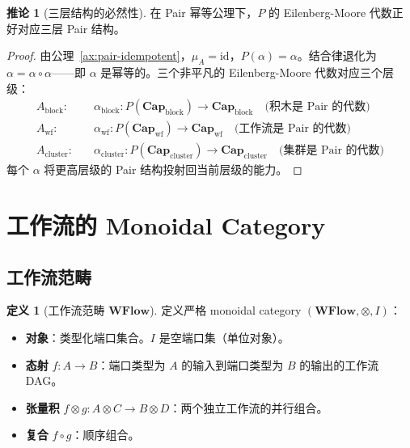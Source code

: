 \documentclass[11pt,a4paper]{article}
\theoremstyle{definition}
\newtheorem{corollary}[theorem]{推论}
\theoremstyle{definition}
\newtheorem{definition}[theorem]{定义}
\theoremstyle{remark}
\newcommand{\cat}[1]{\mathbf{#1}}
\newcommand{\catWFlow}{\cat{WFlow}}
\newcommand{\catCap}{\cat{Cap}}
\newcommand{\id}{\mathrm{id}}
\newcommand{\tensor}{\otimes}
\newcommand{\pairMonad}{P}
\begin{document}
\begin{corollary}[三层结构的必然性]
在 Pair 幂等公理下，$\pairMonad$ 的 Eilenberg-Moore 代数正好对应三层 Pair 结构。
\label{cor:three-levels}
\end{corollary}

\begin{proof}
由公理~\ref{ax:pair-idempotent}，$\mu_A = \id$，$\pairMonad(\alpha) = \alpha$。结合律退化为 $\alpha = \alpha \circ \alpha$——即 $\alpha$ 是幂等的。三个非平凡的 Eilenberg-Moore 代数对应三个层级：
\[
\begin{aligned}
A_{\mathrm{block}}:&\quad \alpha_{\mathrm{block}}: \pairMonad(\catCap_{\mathrm{block}}) \to \catCap_{\mathrm{block}} \quad\text{(积木是 Pair 的代数)} \\
A_{\mathrm{wf}}:&\quad \alpha_{\mathrm{wf}}: \pairMonad(\catCap_{\mathrm{wf}}) \to \catCap_{\mathrm{wf}} \quad\text{(工作流是 Pair 的代数)} \\
A_{\mathrm{cluster}}:&\quad \alpha_{\mathrm{cluster}}: \pairMonad(\catCap_{\mathrm{cluster}}) \to \catCap_{\mathrm{cluster}} \quad\text{(集群是 Pair 的代数)}
\end{aligned}
\]
每个 $\alpha$ 将更高层级的 Pair 结构投射回当前层级的能力。
\end{proof}

\section{工作流的 Monoidal Category}

\subsection{工作流范畴}

\begin{definition}[工作流范畴 $\catWFlow$]
定义严格 monoidal category $(\catWFlow, \tensor, I)$：
\begin{itemize}[leftmargin=2em]
    \item \textbf{对象}：类型化端口集合。$I$ 是空端口集（单位对象）。
    \item \textbf{态射} $f: A \to B$：端口类型为 $A$ 的输入到端口类型为 $B$ 的输出的工作流 DAG。
    \item \textbf{张量积} $f \tensor g: A\tensor C \to B\tensor D$：两个独立工作流的并行组合。
    \item \textbf{复合} $f \circ g$：顺序组合。
\end{itemize}
\end{definition}
\end{document}
